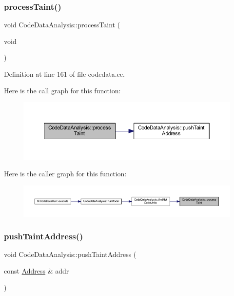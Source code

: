 \subsubsection{\texorpdfstring{processTaint()}{processTaint()}}
{\footnotesize\ttfamily void Code\+Data\+Analysis\+::process\+Taint (\begin{DoxyParamCaption}\item[{void}]{ }\end{DoxyParamCaption})}



Definition at line 161 of file codedata.\+cc.

Here is the call graph for this function\+:
\nopagebreak
\begin{figure}[H]
\begin{center}
\leavevmode
\includegraphics[width=350pt]{class_code_data_analysis_af81c1c8ff3416ae4487a9d81eb0c1df3_cgraph}
\end{center}
\end{figure}
Here is the caller graph for this function\+:
\nopagebreak
\begin{figure}[H]
\begin{center}
\leavevmode
\includegraphics[width=350pt]{class_code_data_analysis_af81c1c8ff3416ae4487a9d81eb0c1df3_icgraph}
\end{center}
\end{figure}
\mbox{\label{class_code_data_analysis_aa8cc98d84537294fa40b2f6dd9dce67c}} 
\subsubsection{\texorpdfstring{pushTaintAddress()}{pushTaintAddress()}}
{\footnotesize\ttfamily void Code\+Data\+Analysis\+::push\+Taint\+Address (\begin{DoxyParamCaption}\item[{const \mbox{\hyperlink{class_address}{Address}} \&}]{addr }\end{DoxyParamCaption})}



